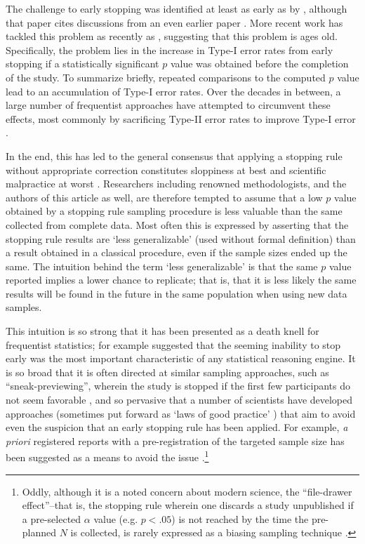 \documentclass[man]{apa7}
\theoremstyle{definition}
\begin{document}
The challenge to early stopping was identified at least as early as \citeyear{Wald_method_1945} by \citeauthor{Wald_method_1945}, although that paper cites discussions from an even earlier paper \parencite[specifically][]{Dodge_method_1929}.  More recent work has tackled this problem as recently as \parencite{grieve2024probability}, suggesting that this problem is ages old.  Specifically, the problem lies in the increase in Type-I error rates from early stopping if a statistically significant $p$ value was obtained before the completion of the study.  To summarize briefly, repeated comparisons to the computed $p$ value lead to an accumulation of Type-I error rates.  Over the decades in between, a large number of frequentist approaches have attempted to circumvent these effects, most commonly by sacrificing Type-II error rates to improve Type-I error \parencite[see, e.g.][]{pocock1977group, o1979multiple}.

In the end, this has led to the general consensus that applying a stopping rule without appropriate correction constitutes sloppiness at best and scientific malpractice at worst \parencite{fanelli2009many}.  Researchers including renowned methodologists, and the authors of this article as well, are therefore tempted to assume that a low $p$ value obtained by a stopping rule sampling procedure is less valuable than the same collected from complete data.  Most often this is expressed by asserting that the stopping rule results are `less generalizable' (used without formal definition) than a result obtained in a classical procedure, even if the sample sizes ended up the same.  The intuition behind the term `less generalizable' is that the same $p$ value reported implies a lower chance to replicate; that is, that it is less likely the same results will be found in the future in the same population when using new data samples. 

This intuition is so strong that it has been presented as a death knell for frequentist statistics; for example \textcite{Venderkerchove_2014} suggested that the seeming inability to stop early was the most important characteristic of any statistical reasoning engine.  It is so broad that it is often directed at similar sampling approaches, such as ``sneak-previewing'', wherein the study is stopped if the first few participants do not seem favorable \parencite[see, e.g.][]{armitage1969repeated}, and so pervasive that a number of scientists have developed approaches (sometimes put forward as `laws of good practice' \parencite{simmons2011false}) that aim to avoid even the suspicion that an early stopping rule has been applied. For example, \textit{a priori} registered reports with a pre-registration of the targeted sample size has been suggested as a means to avoid the issue \parencite{nosek2014registered}.\footnote{Oddly, although it is a noted concern about modern science, the ``file-drawer effect''--that is, the stopping rule wherein one discards a study unpublished if a pre-selected $\alpha$ value (e.g. $p < .05$) is not reached by the time the pre-planned $N$ is collected, is rarely expressed as a biasing sampling technique \parencite{rosenthal1979file}.}
\end{document}
